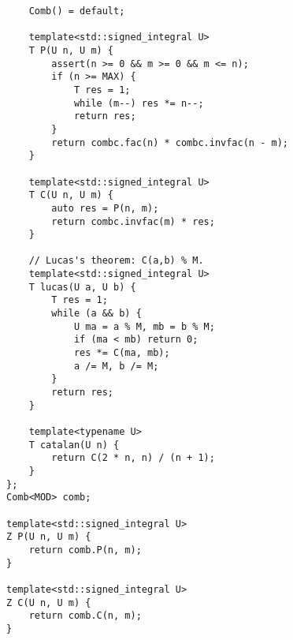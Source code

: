 \documentclass[UTF8]{ctexart}
\begin{document}
\begin{lstlisting}
    Comb() = default;

    template<std::signed_integral U>
    T P(U n, U m) {
        assert(n >= 0 && m >= 0 && m <= n);
        if (n >= MAX) {
            T res = 1;
            while (m--) res *= n--;
            return res;
        }
        return combc.fac(n) * combc.invfac(n - m);
    }

    template<std::signed_integral U>
    T C(U n, U m) {
        auto res = P(n, m);
        return combc.invfac(m) * res;
    }

    // Lucas's theorem: C(a,b) % M.
    template<std::signed_integral U>
    T lucas(U a, U b) {
        T res = 1;
        while (a && b) {
            U ma = a % M, mb = b % M;
            if (ma < mb) return 0;
            res *= C(ma, mb);
            a /= M, b /= M;
        }
        return res;
    }

    template<typename U>
    T catalan(U n) {
        return C(2 * n, n) / (n + 1);
    }
};
Comb<MOD> comb;

template<std::signed_integral U>
Z P(U n, U m) {
    return comb.P(n, m);
}

template<std::signed_integral U>
Z C(U n, U m) {
    return comb.C(n, m);
}
\end{lstlisting}
\end{document}
